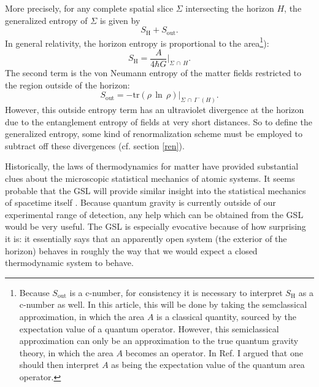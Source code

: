 \documentclass{article}
\begin{document}
More precisely, for any complete spatial slice $\Sigma$ intersecting the horizon $H$, the generalized entropy of $\Sigma$ is given by
\begin{equation}
S_\mathrm{H} + S_\mathrm{out}.
\end{equation}
In general relativity, the horizon entropy is proportional to the area\footnote{Because $S_\mathrm{out}$ is a c-number, for consistency it is necessary to interpret $S_\mathrm{H}$ as a c-number as well.  In this article, this will be done by taking the semclassical approximation, in which the area $A$ is a classical quantity, sourced by the expectation value of a quantum operator.  However, this semiclassical approximation can only be an approximation to the true quantum gravity theory, in which the area $A$ becomes an operator.  In Ref. \cite{10proofs} I argued that one should then interpret $A$ as being the expectation value of the quantum area operator.}):
\begin{equation}
S_\mathrm{H} = \frac{A}{4\hbar G}|_{\Sigma\,\cap\,H}.
\end{equation}
The second term is the von Neumann entropy of the matter fields restricted to the region outside of the horizon:
\begin{equation}
S_\mathrm{out} = -\mathrm{tr}(\rho\,\ln\,\rho)|_{\Sigma\,\cap\,I^{-}(H)}.
\end{equation}
However, this outside entropy term has an ultraviolet divergence at the horizon due to the entanglement entropy of fields at very short distances.   So to define the generalized entropy, some kind of renormalization scheme must be employed to subtract off these divergences (cf. section \ref{ren}).

Historically, the laws of thermodynamics for matter have provided substantial clues about the microscopic statistical mechanics of atomic systems.  It seems probable that the GSL will provide similar insight into the statistical mechanics of spacetime itself \cite{sorkin83}.  Because quantum gravity is currently outside of our experimental range of detection, any help which can be obtained from the GSL would be very useful.  The GSL is especially evocative because of how surprising it is: it essentially says that an apparently open system (the exterior of the horizon) behaves in roughly the way that we would expect a closed thermodynamic system to behave.
\end{document}
